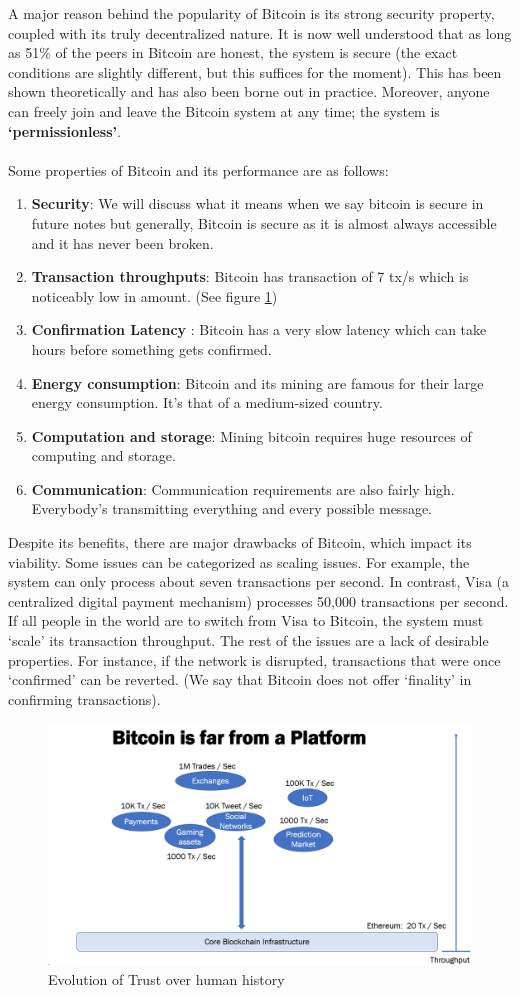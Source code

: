A major reason behind the popularity of Bitcoin is its strong security property, coupled with its truly decentralized nature. It is now well understood that as long as 51\% of the peers in Bitcoin are honest, the system is secure (the exact conditions are slightly different, but this suffices for the moment). This has been shown theoretically and has also been borne out in practice. Moreover, anyone can freely join and leave the Bitcoin system at any time; the system is \textbf{‘permissionless’}.\\\\
Some properties of Bitcoin and its performance are as follows:
\begin{enumerate}
    \item \textbf{Security}: We will discuss what it means when we say bitcoin is secure in future notes but generally, Bitcoin is secure as it is almost always accessible and it has never been broken.
    \item \textbf{Transaction throughputs}: Bitcoin has transaction of 7 tx/s which is noticeably low in amount. (See figure \ref{fig:f3})
    \item \textbf{Confirmation Latency }: Bitcoin has a very slow latency which can take hours before something gets confirmed.
    \item \textbf{Energy consumption}: Bitcoin and its mining are famous for their large energy consumption. It's that of a medium-sized country.
    \item \textbf{Computation and storage}: Mining bitcoin requires huge resources of computing and storage.
    \item \textbf{Communication}: Communication requirements are also fairly high. Everybody's transmitting everything and every possible message.
\end{enumerate}
Despite its benefits, there are major drawbacks of Bitcoin, which impact its viability. Some issues can be categorized as scaling issues. For example, the system can only process about seven transactions per second. In contrast, Visa (a centralized digital payment mechanism) processes 50,000 transactions per second. If all people in the world are to switch from Visa to Bitcoin, the system must ‘scale’ its transaction throughput. The rest of the issues are a lack of desirable properties. For instance, if the network is disrupted, transactions that were once ‘confirmed’ can be reverted. (We say that Bitcoin does not offer ‘finality’ in confirming transactions).
\begin{figure}[h!]
    \centering
    \includegraphics[width=0.8\linewidth]{Fig/01/F3}
    \caption{Evolution of Trust over human history}
    \label{fig:f3}
\end{figure}
